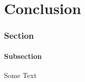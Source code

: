 %
%



\clearpage
\newpage
{}

\newpage
\tableofcontents
\clearpage
\listoffigures
\listoftables
\clearpage
\setcounter{page}{1}

\part{Conclusion}
\section{Section}
\subsection{Subsection}
Some Text
% 

% 

